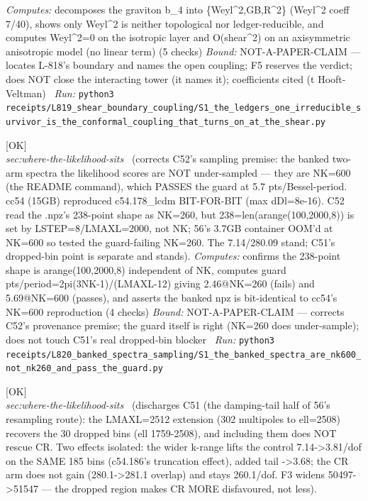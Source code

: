 \begin{description}
\emph{Computes:} decomposes the graviton b\_4 into \{Weyl\textasciicircum{}2,GB,R\textasciicircum{}2\} (Weyl\textasciicircum{}2 coeff 7/40), shows only Weyl\textasciicircum{}2 is neither topological nor ledger-reducible, and computes Weyl\textasciicircum{}2=0 on the isotropic layer and O(shear\textasciicircum{}2) on an axisymmetric anisotropic model (no linear term) (5 checks)
 \emph{Bound:} NOT-A-PAPER-CLAIM --- locates L-818's boundary and names the open coupling; F5 reserves the verdict; does NOT close the interacting tower (it names it); coefficients cited (t Hooft-Veltman)
\ \emph{Run:} \texttt{python3 receipts/L819\_shear\_boundary\_coupling/S1\_the\_ledgers\_one\_irreducible\_survivor\_is\_the\_conformal\_coupling\_that\_turns\_on\_at\_the\_shear.py}
\item[\label{rcpt:S1_the_banked_spectra_are_nk600_not_nk260_and_pass_the_guard}\texttt{S1\_the\_banked\_spectra\_are\_nk600\_not\_nk260\_and\_pass\_the\_guard}]\hfill\textsf{[OK]}\\
\textit{sec:where-the-likelihood-sits} \ (corrects C52's sampling premise: the banked two-arm spectra the likelihood scores are NOT under-sampled --- they are NK=600 (the README command), which PASSES the guard at 5.7 pts/Bessel-period. cc54 (15GB) reproduced c54.178\_lcdm BIT-FOR-BIT (max \textbar{}dDl\textbar{}=8e-16). C52 read the .npz's 238-point shape as NK=260, but 238=len(arange(100,2000,8)) is set by LSTEP=8/LMAXL=2000, not NK; 56's 3.7GB container OOM'd at NK=600 so tested the guard-failing NK=260. The 7.14/280.09 stand; C51's dropped-bin point is separate and stands). 
\emph{Computes:} confirms the 238-point shape is arange(100,2000,8) independent of NK, computes guard pts/period=2pi(3NK-1)/(LMAXL-12) giving 2.46@NK=260 (fails) and 5.69@NK=600 (passes), and asserts the banked npz is bit-identical to cc54's NK=600 reproduction (4 checks)
 \emph{Bound:} NOT-A-PAPER-CLAIM --- corrects C52's provenance premise; the guard itself is right (NK=260 does under-sample); does not touch C51's real dropped-bin blocker
\ \emph{Run:} \texttt{python3 receipts/L820\_banked\_spectra\_sampling/S1\_the\_banked\_spectra\_are\_nk600\_not\_nk260\_and\_pass\_the\_guard.py}
\item[\label{rcpt:S2_the_lmax2512_extension_recovers_c51s_dropped_bins_and_CR_stays_disfavoured}\texttt{S2\_the\_lmax2512\_extension\_recovers\_c51s\_dropped\_bins\_and\_CR\_stays\_disfavoured}]\hfill\textsf{[OK]}\\
\textit{sec:where-the-likelihood-sits} \ (discharges C51 (the damping-tail half of 56's resampling route): the LMAXL=2512 extension (302 multipoles to ell=2508) recovers the 30 dropped bins (ell 1759-2508), and including them does NOT rescue CR. Two effects isolated: the wider k-range lifts the control 7.14->3.81/dof on the SAME 185 bins (c54.186's truncation effect), added tail ->3.68; the CR arm does not gain (280.1->281.1 overlap) and stays 260.1/dof. F3 widens 50497->51547 --- the dropped region makes CR MORE disfavoured, not less). 

\end{description}
